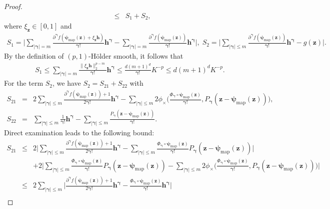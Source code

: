 \documentclass[11pt, preprint]{imsart}
\numberwithin{equation}{section}
\def \bfgamma{\bm{\gamma}}
\def \bfz{\mathbf{z}}
\def \bfh{\mathbf{h}}
\theoremstyle{plain}
\theoremstyle{definition}
\begin{document}
\begin{proof}
\begin{eqnarray}
	&\leq& S_1+S_2,\nonumber
\end{eqnarray}
where $\xi_{\bfz}\in [0, 1]$ and
\begin{eqnarray}
	S_1=\bigg|\sum_{|\bfgamma|= m}\frac{\partial^{\bfgamma}f(\bm{\psi}_{\textrm{map}}(\bfz)+\xi_{\bfz}\bfh)}{\bfgamma !}\bfh^{\bfgamma}-\sum_{|\bfgamma|= m}\frac{\partial^{\bfgamma}f(\bm{\psi}_{\textrm{map}}(\bfz))}{\bfgamma !}\bfh^{\bfgamma}\bigg|, \; S_2= \bigg|\sum_{|\bfgamma|\leq m}\frac{\partial^{\bfgamma}f(\bm{\psi}_{\textrm{map}}(\bfz))}{\bfgamma !}\bfh^{\bfgamma}-g(\bfz)\bigg|.\nonumber
\end{eqnarray}
By the definition of $(p, 1)$-H\" older smooth, it follows that
\begin{eqnarray}
	S_1\leq \sum_{|\bfgamma|=m}\frac{\|\xi_{\bfz}\bfh\|_2^{p-m}}{\bfgamma !}\bfh^{\bfgamma}\leq \frac{d(m+1)^d}{\bfgamma !}K^{-p}\leq d(m+1)^dK^{-p}.\nonumber
\end{eqnarray}
For the term $S_2$, we have $S_2=S_{21}+S_{22}$ with
\begin{eqnarray}
	S_{21}&=&2\sum_{|\bfgamma|\leq m}\frac{\partial^{\bfgamma}f(\bm{\psi}_{\textrm{map}}(\bfz))+1}{2\bfgamma !}\bfh^{\bfgamma}-\sum_{|\bfgamma|\leq m}2\phi_{\times}\bigg(\frac{\Phi_{\bfgamma}\circ \bm{\psi}_{\textrm{map}}(\bfz)}{\bfgamma !}, P_{\bfgamma}(\bfz- \bm{\psi}_{\textrm{map}}(\bfz))\bigg),\nonumber\\
	S_{22}&=&\sum_{|\bfgamma|\leq m}\frac{1}{\bfgamma !}\bfh^{\bfgamma}-\sum_{|\bfgamma|\leq m}\frac{P_{\bfgamma}(\bfz- \bm{\psi}_{\textrm{map}}(\bfz))}{\bfgamma !}.\nonumber
\end{eqnarray}
Direct examination leads to the following bound:
\begin{eqnarray}
	S_{21}&\leq&  2\bigg|\sum_{|\bfgamma|\leq m}\frac{\partial^{\bfgamma}f(\bm{\psi}_{\textrm{map}}(\bfz))+1}{2\bfgamma !}\bfh^{\bfgamma}-\sum_{|\bfgamma|\leq m}\frac{\Phi_{\bfgamma}\circ \bm{\psi}_{\textrm{map}}(\bfz)}{\bfgamma !} P_{\bfgamma}(\bfz- \bm{\psi}_{\textrm{map}}(\bfz))\bigg|\nonumber\\
	&&+2\bigg|\sum_{|\bfgamma|\leq m}\frac{\Phi_{\bfgamma}\circ \bm{\psi}_{\textrm{map}}(\bfz)}{\bfgamma !} P_{\bfgamma}(\bfz- \bm{\psi}_{\textrm{map}}(\bfz))-\sum_{|\bfgamma|\leq m}2\phi_{\times}\bigg(\frac{\Phi_{\bfgamma}\circ \bm{\psi}_{\textrm{map}}(\bfz)}{\bfgamma !}, P_{\bfgamma}(\bfz- \bm{\psi}_{\textrm{map}}(\bfz))\bigg)\bigg|\nonumber\\
	&\leq&2\sum_{|\bfgamma|\leq m}\bigg|\frac{\partial^{\bfgamma}f(\bm{\psi}_{\textrm{map}}(\bfz))+1}{2\bfgamma !}\bfh^{\bfgamma}-\frac{\Phi_{\bfgamma}\circ \bm{\psi}_{\textrm{map}}(\bfz)}{\bfgamma !}\bfh^{\bfgamma}\bigg|\nonumber\\ 

\end{eqnarray}
\end{proof}
\end{document}
